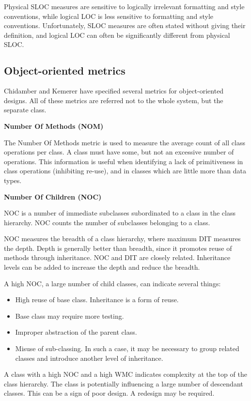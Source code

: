 Physical SLOC measures are sensitive to logically irrelevant formatting and style conventions, while logical LOC is less sensitive to formatting and style conventions. Unfortunately, SLOC measures are often stated without giving their definition, and logical LOC can often be significantly different from physical SLOC.

\subsection{Object-oriented metrics}

Chidamber and Kemerer have specified several metrics for object-oriented designs. All of these metrics are referred not to the whole system, but the separate class.

\textbf{Number Of Methods (NOM)}

The Number Of Methods metric is used to measure the average count of all class operations per class. A class must have some, but not an excessive number of operations. This information is useful when identifying a lack of primitiveness in class operations (inhibiting re-use), and in classes which are little more than data types.

\textbf{Number Of Children (NOC)}

NOC is a number of immediate subclasses subordinated to a class in the class hierarchy. NOC counts the number of subclasses belonging to a class.

NOC measures the breadth of a class hierarchy, where maximum DIT measures the depth. Depth is generally better than breadth, since it promotes reuse of methods through inheritance. NOC and DIT are closely related. Inheritance levels can be added to increase the depth and reduce the breadth.

A high NOC, a large number of child classes, can indicate several things: 
\begin{itemize}
	\item High reuse of base class. Inheritance is a form of reuse.
	\item Base class may require more testing.
	\item Improper abstraction of the parent class. 
	\item Misuse of sub-classing. In such a case, it may be necessary to group related classes and introduce another level of inheritance.
\end{itemize}

A class with a high NOC and a high WMC indicates complexity at the top of the class hierarchy. The class is potentially influencing a large number of descendant classes. This can be a sign of poor design. A redesign may be required.

